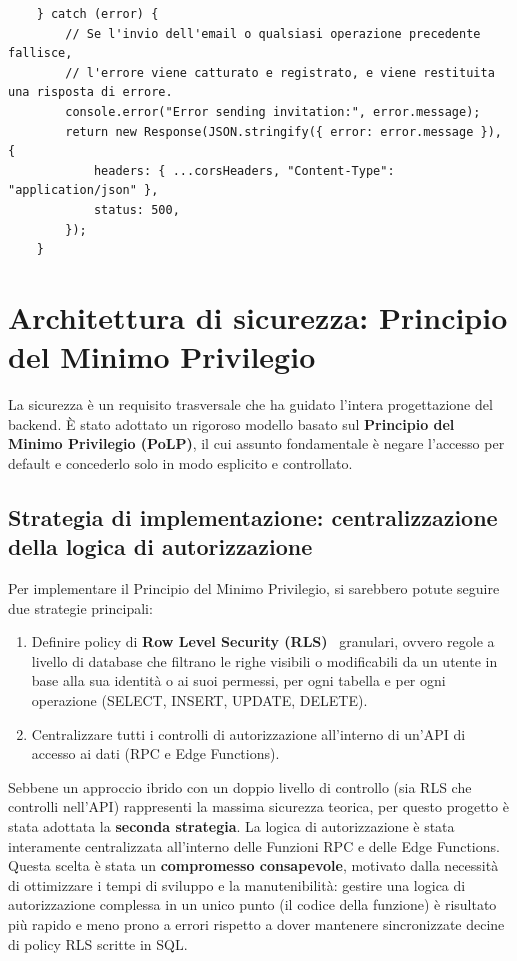 \begin{longlisting}
\begin{verbatim}
    } catch (error) {
        // Se l'invio dell'email o qualsiasi operazione precedente fallisce,
        // l'errore viene catturato e registrato, e viene restituita una risposta di errore.
        console.error("Error sending invitation:", error.message);
        return new Response(JSON.stringify({ error: error.message }), {
            headers: { ...corsHeaders, "Content-Type": "application/json" },
            status: 500,
        });
    }
    \end{verbatim}
    \caption{Estratto dalla Edge Function ``organizer-invite-juror'' che mostra l'invocazione dell'API di Resend.}
    \label{lst:resend_invocation}
\end{longlisting}

\section{Architettura di sicurezza: Principio del Minimo Privilegio}\label{sec:architettura-di-sicurezza:-principio-del-minimo-privilegio}
La sicurezza è un requisito trasversale che ha guidato l'intera progettazione del backend.
È stato adottato un rigoroso modello basato sul \textbf{Principio del Minimo Privilegio (PoLP)}, il cui assunto fondamentale è negare l'accesso per default e concederlo solo in modo esplicito e controllato.

\subsection{Strategia di implementazione: centralizzazione della logica di autorizzazione}\label{subsec:strategia-di-implementazione:-centralizzazione-della-logica-di-autorizzazione}
Per implementare il Principio del Minimo Privilegio, si sarebbero potute seguire due strategie principali:
\begin{enumerate}
    \item Definire policy di \textbf{Row Level Security (RLS)}~\cite{postgresql_docs} granulari, ovvero regole a livello di database che filtrano le righe visibili o modificabili da un utente in base alla sua identità o ai suoi permessi, per ogni tabella e per ogni operazione (SELECT, INSERT, UPDATE, DELETE).
    \item Centralizzare tutti i controlli di autorizzazione all'interno di un'API di accesso ai dati (RPC e Edge Functions).
\end{enumerate}

Sebbene un approccio ibrido con un doppio livello di controllo (sia RLS che controlli nell'API) rappresenti la massima sicurezza teorica, per questo progetto è stata adottata la \textbf{seconda strategia}.
La logica di autorizzazione è stata interamente centralizzata all'interno delle Funzioni RPC e delle Edge Functions.
Questa scelta è stata un \textbf{compromesso consapevole}, motivato dalla necessità di ottimizzare i tempi di sviluppo e la manutenibilità: gestire una logica di autorizzazione complessa in un unico punto (il codice della funzione) è risultato più rapido e meno prono a errori rispetto a dover mantenere sincronizzate decine di policy RLS scritte in SQL.

